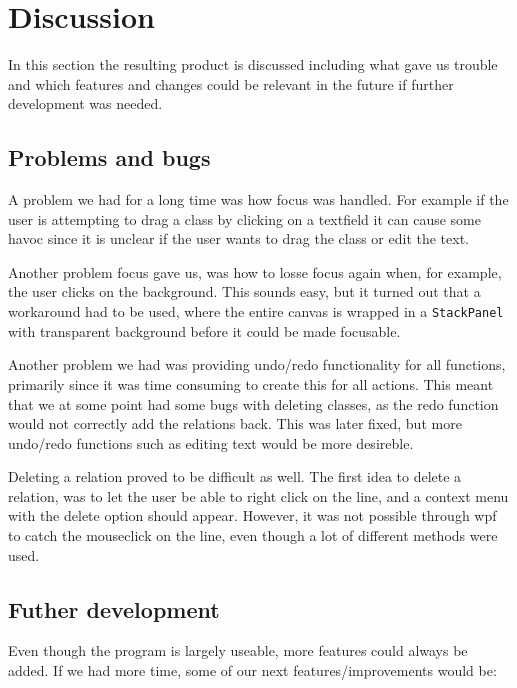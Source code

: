 \section{Discussion}
In this section the resulting product is discussed including what gave us trouble and
which features and changes could be relevant in the future if further
development was needed.

\subsection{Problems and bugs}
A problem we had for a long time was how focus was handled. For example if the
user is attempting to drag a class by clicking on a textfield it can cause some
havoc since it is unclear if the user wants to drag the class or edit the text. 

Another problem focus gave us, was how to losse focus again when, for example, 
the
user clicks on the background. This sounds easy, but it turned out that a
workaround had to be used, where the entire canvas is wrapped in a
\texttt{StackPanel} with transparent background before it could be made
focusable.

Another problem we had was providing undo/redo functionality for all functions,
primarily since it was time consuming to create this for all actions. This meant
that we at some point had some bugs with deleting classes, as the redo function
would not correctly add the relations back. This was later fixed, but more
undo/redo functions such as editing text would be more desireble. 

Deleting a relation proved to be difficult as well. The first idea to delete a
relation, was to let the user be able to right click on the line, and a context
menu with the delete option should appear. However, it was not possible through
wpf to catch the mouseclick on the line, even though a lot of different methods
were used.

\subsection{Futher development}
Even though the program is largely useable, more features could always be added.
If we had more time, some of our next features/improvements would be:

